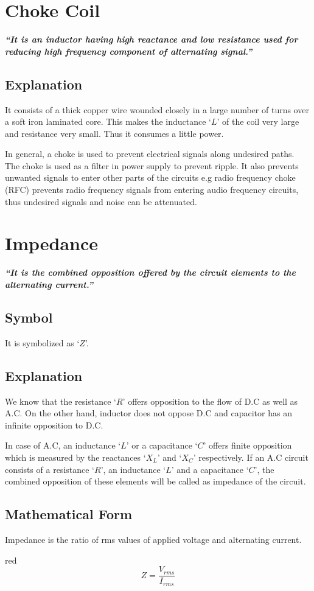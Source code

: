 \section{Choke Coil}
\textit{\textbf{“It is an inductor having high reactance and
low resistance used for reducing high frequency component of alternating
signal.”}}
\subsection*{Explanation}
 It consists of a thick copper wire wounded closely in a large
 number of turns over a soft iron laminated core. This makes the
 inductance ‘$L$’ of the coil very large and resistance very small.
 Thus it consumes a little power.
  
 In general, a choke is used to prevent electrical signals along
 undesired paths. The choke is used as a filter in power supply to
 prevent ripple. It also prevents unwanted signals to enter other parts
 of the circuits e.g radio frequency choke (RFC) prevents radio frequency
 signals from entering audio frequency circuits, thus undesired signals
 and noise can be attenuated.
\section{Impedance}
\textit{\textbf{“It is the combined opposition offered by the
circuit elements to the alternating current.”}}
\subsection*{Symbol}
  It is symbolized as `$Z$'. 
\subsection*{Explanation}
We know that the resistance `$R$' offers opposition to the flow of
D.C as well as A.C. On the other hand, inductor does not oppose D.C
and capacitor has an infinite opposition to D.C.
 
In case of A.C, an inductance ‘$L$’ or a capacitance ‘$C$’ offers
finite opposition which is measured by the reactances ‘$X_{L}$’
and ‘$X_{C}$’ respectively. If an A.C circuit consists of a resistance
‘$R$’, an inductance ‘$L$’ and a capacitance ‘$C$’, the combined
opposition of these elements will be called as impedance of the circuit.
\subsection*{Mathematical Form}
Impedance is the ratio of rms values of applied voltage and alternating
current.
\begin{mybox}{red}{}
\begin{equation}\label{eq:15.25}
    Z=\frac{V_{rms}}{I_{rms}}
\end{equation}{}
\end{mybox}
